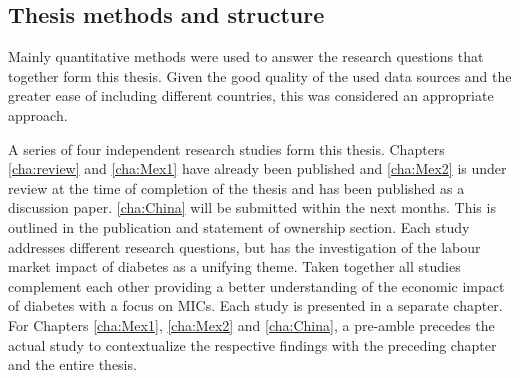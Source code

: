 \subsection{Thesis methods and structure}

Mainly quantitative methods were used to answer the research questions that together form this thesis. Given the good quality of the used data sources and the greater ease of including different countries, this was considered an appropriate approach.

A series of four independent research studies form this thesis. Chapters \ref{cha:review} and \ref{cha:Mex1} have already been published and \ref{cha:Mex2} is under review at the time of completion of the thesis and has been published as a discussion paper. \ref{cha:China} will be submitted within the next months. This is outlined in the publication and statement of ownership section. Each study addresses different research questions, but has the investigation of the labour market impact of diabetes as a unifying theme. Taken together all studies complement each other providing a better understanding of the economic impact of diabetes with a focus on \acp{MIC}. Each study is presented in a separate chapter. For Chapters \ref{cha:Mex1}, \ref{cha:Mex2} and \ref{cha:China}, a pre-amble precedes the actual study to contextualize the respective findings with the preceding chapter and the entire thesis.


